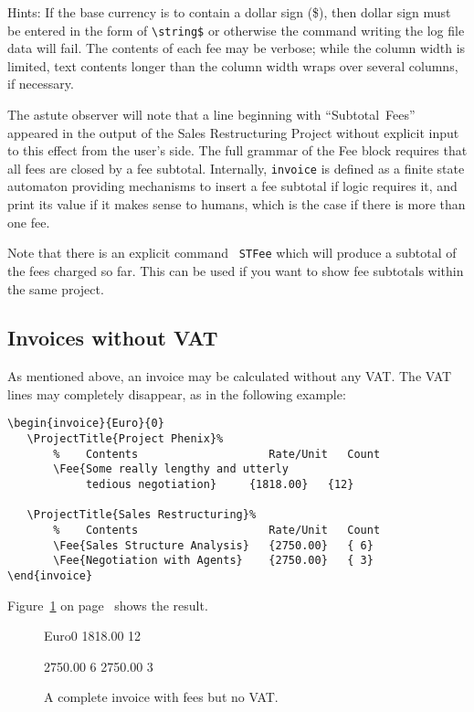\documentclass[11pt]{ltxdoc}
\begin{document}
Hints: If the base currency is to contain a dollar sign (\$), then
dollar sign must be entered in the form of \verb|\string$|
or otherwise the command writing the log file data will fail. The
contents of each fee may be verbose; while the column width is
limited, text contents longer than the column width wraps over
several columns, if necessary.

The astute observer will note that a line beginning with ``Subtotal~Fees''
appeared in the output of the Sales Restructuring Project without explicit
input to this effect from the user's side. The full grammar of the Fee block
requires that all fees are closed by a fee subtotal. Internally,
\texttt{invoice} is defined as a finite state automaton providing
mechanisms to insert a fee subtotal if logic requires it, and print
its value if it makes sense to humans, which is the case if there is more
than one fee.

Note that there is an explicit command \texttt{ STFee} which will
produce a subtotal of the fees charged so far. This can be used if
you want to show fee subtotals within the same project.


\subsection{Invoices without VAT}

As mentioned above, an invoice may be calculated without any VAT.
The VAT lines may completely disappear, as in the following
example:
\begin{verbatim}
\begin{invoice}{Euro}{0}
   \ProjectTitle{Project Phenix}%
       %    Contents                    Rate/Unit   Count
       \Fee{Some really lengthy and utterly
       		tedious negotiation}     {1818.00}   {12}

   \ProjectTitle{Sales Restructuring}%
       %    Contents                    Rate/Unit   Count
       \Fee{Sales Structure Analysis}   {2750.00}   { 6}
       \Fee{Negotiation with Agents}    {2750.00}   { 3}
\end{invoice}
\end{verbatim}


Figure~\ref{invoice_without_VAT} on
page~\pageref{invoice_without_VAT}
shows the result.

\begin{figure}[h]
\begin{invoice}{Euro}{0}
		{1818.00}	{12}

           {2750.00}   { 6}
            {2750.00}   { 3}
\end{invoice}
\caption{A complete invoice
		with fees but no VAT.\label{invoice_without_VAT}}
\end{figure}
\end{document}

